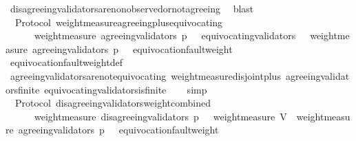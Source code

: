 \begin{isabellebody}
\ disagreeing{\isacharunderscore}validators{\isacharunderscore}are{\isacharunderscore}non{\isacharunderscore}observed{\isacharunderscore}or{\isacharunderscore}not{\isacharunderscore}agreeing\ \isamarkupfalse%
\ blast%
\endisatagproof
{\isafoldproof}%
%
\isadelimproof
\isanewline
%
\endisadelimproof
\isanewline
{}\isamarkupfalse%
\ {\isacharparenleft}\ Protocol{\isacharparenright}\ weight{\isacharunderscore}measure{\isacharunderscore}agreeing{\isacharunderscore}plus{\isacharunderscore}equivocating\ {\isacharcolon}\isanewline
\ \ {\isachardoublequoteopen}{\isasymforall}\ {\isasymsigma}\ {\isasymin}\ {\isasymSigma}{\isachardot}\ weight{\isacharunderscore}measure\ {\isacharparenleft}agreeing{\isacharunderscore}validators\ {\isacharparenleft}p{\isacharcomma}\ {\isasymsigma}{\isacharparenright}\ {\isasymunion}\ equivocating{\isacharunderscore}validators\ {\isasymsigma}{\isacharparenright}\ {\isacharequal}\ weight{\isacharunderscore}measure\ {\isacharparenleft}agreeing{\isacharunderscore}validators\ {\isacharparenleft}p{\isacharcomma}\ {\isasymsigma}{\isacharparenright}{\isacharparenright}\ {\isacharplus}\ equivocation{\isacharunderscore}fault{\isacharunderscore}weight\ {\isasymsigma}{\isachardoublequoteclose}\isanewline
%
\isadelimproof
\ \ %
\endisadelimproof
%
\isatagproof
{}\isamarkupfalse%
\ equivocation{\isacharunderscore}fault{\isacharunderscore}weight{\isacharunderscore}def\isanewline
\ \ \isamarkupfalse%
\ agreeing{\isacharunderscore}validators{\isacharunderscore}are{\isacharunderscore}not{\isacharunderscore}equivocating\ weight{\isacharunderscore}measure{\isacharunderscore}disjoint{\isacharunderscore}plus\ agreeing{\isacharunderscore}validators{\isacharunderscore}finite\ equivocating{\isacharunderscore}validators{\isacharunderscore}is{\isacharunderscore}finite\isanewline
\ \ \isamarkupfalse%
\ simp%
\endisatagproof
{\isafoldproof}%
%
\isadelimproof
\isanewline
%
\endisadelimproof
\isanewline
{}\isamarkupfalse%
\ {\isacharparenleft}\ Protocol{\isacharparenright}\ disagreeing{\isacharunderscore}validators{\isacharunderscore}weight{\isacharunderscore}combined\ {\isacharcolon}\isanewline
\ \ {\isachardoublequoteopen}{\isasymforall}\ {\isasymsigma}\ {\isasymin}\ {\isasymSigma}{\isachardot}\ weight{\isacharunderscore}measure\ {\isacharparenleft}disagreeing{\isacharunderscore}validators\ {\isacharparenleft}p{\isacharcomma}\ {\isasymsigma}{\isacharparenright}{\isacharparenright}\ {\isacharequal}\ weight{\isacharunderscore}measure\ V\ {\isacharminus}\ weight{\isacharunderscore}measure\ {\isacharparenleft}agreeing{\isacharunderscore}validators\ {\isacharparenleft}p{\isacharcomma}\ {\isasymsigma}{\isacharparenright}{\isacharparenright}\ {\isacharminus}\ equivocation{\isacharunderscore}fault{\isacharunderscore}weight\ {\isasymsigma}{\isachardoublequoteclose}\isanewline

\end{isabellebody}
